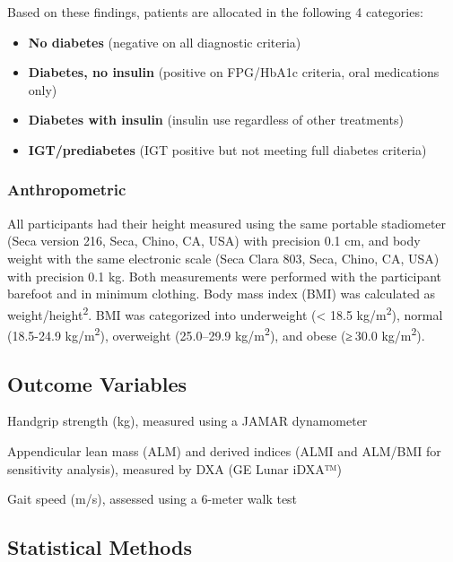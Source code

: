 \documentclass[
  11pt,
]{article}
\begin{document}
Based on these findings, patients are allocated in the following 4
categories:

\begin{itemize}
\item
  \textbf{No diabetes} (negative on all diagnostic criteria)
\item
  \textbf{Diabetes, no insulin} (positive on FPG/HbA1c criteria, oral
  medications only)
\item
  \textbf{Diabetes with insulin} (insulin use regardless of other
  treatments)
\item
  \textbf{IGT/prediabetes} (IGT positive but not meeting full diabetes
  criteria)
\end{itemize}

\subsubsection{\texorpdfstring{\textbf{Anthropometric}}{Anthropometric}}\label{anthropometric}

All participants had their height measured using the same portable
stadiometer (Seca version 216, Seca, Chino, CA, USA) with precision 0.1
cm, and body weight with the same electronic scale (Seca Clara 803,
Seca, Chino, CA, USA) with precision 0.1 kg. Both measurements were
performed with the participant barefoot and in minimum clothing. Body
mass index (BMI) was calculated as weight/height\textsuperscript{2}. BMI
was categorized into underweight (\textless{} 18.5
kg/m\textsuperscript{2}), normal (18.5-24.9 kg/m\textsuperscript{2}),
overweight (25.0--29.9 kg/m\textsuperscript{2}), and obese (≥ 30.0
kg/m\textsuperscript{2}).

\subsection{Outcome Variables}\label{outcome-variables}

Handgrip strength (kg), measured using a JAMAR dynamometer

Appendicular lean mass (ALM) and derived indices (ALMI and ALM/BMI for
sensitivity analysis), measured by DXA (GE Lunar iDXA™)

Gait speed (m/s), assessed using a 6-meter walk test

\subsection{Statistical Methods}\label{statistical-methods}
\end{document}
